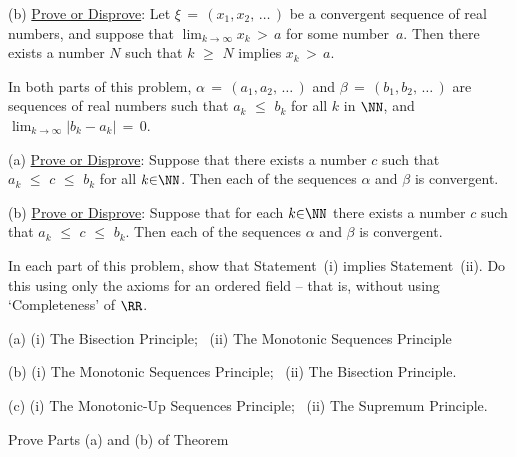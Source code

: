         (b) \underline{Prove or Disprove}: Let ${\xi} \,=\, (x_{1}, x_{2}, \,{\ldots}\,)$ be a convergent sequence of real numbers,
    and suppose that ${\displaystyle \lim_{k {\rightarrow} {\infty}} x_{k} \,>\, a}$ for some number~$a$.
    Then there exists a number $N$ such that $k \,\,{\geq}\,\, N$ implies $x_{k} \,>\,a$.


\V
\V

\noindent \ExCd In both parts of this problem, ${\alpha} \,=\, (a_{1},a_{2},\,{\ldots}\,)$ and ${\beta} \,=\, (b_{1},b_{2},\,{\ldots}\,)$ are sequences of real numbers such that $a_{k} \,\,{\leq}\,\, b_{k}$ for all $k$ in ${\NN}$,
    and ${\displaystyle \lim_{k {\rightarrow} {\infty}} |b_{k}-a_{k}|} \,=\, 0$.

\V

        (a) \underline{Prove or Disprove}: Suppose that there exists a number $c$ such that $a_{k} \,\,{\leq}\,\, c \,\,{\leq}\,\, b_{k}$ for all $k{\in}{\NN}$.
    Then each of the sequences ${\alpha}$ and ${\beta}$ is convergent.

\V

        (b) \underline{Prove or Disprove}: Suppose that for each $k{\in}{\NN}$ there exists a number $c$ such that
    $a_{k} \,\,{\leq}\,\, c \,\,{\leq}\,\, b_{k}$.
    Then each of the sequences ${\alpha}$ and ${\beta}$ is convergent.


\V
\V

\noindent \ExCe In each part of this problem, show that Statement~(i) implies Statement~(ii).
    Do this using only the axioms for an ordered field -- that is, without using `Completeness' of ${\RR}$.


\V

        (a) (i) The Bisection Principle; \, (ii) The Monotonic Sequences Principle

\V

        (b) (i) The Monotonic Sequences Principle; \, (ii) The Bisection Principle.

\V

        (c) (i) The Monotonic-Up Sequences Principle; \, (ii) The Supremum Principle.

\V
\V

\noindent \ExCf Prove Parts (a) and (b) of Theorem~ %


\V
\V

